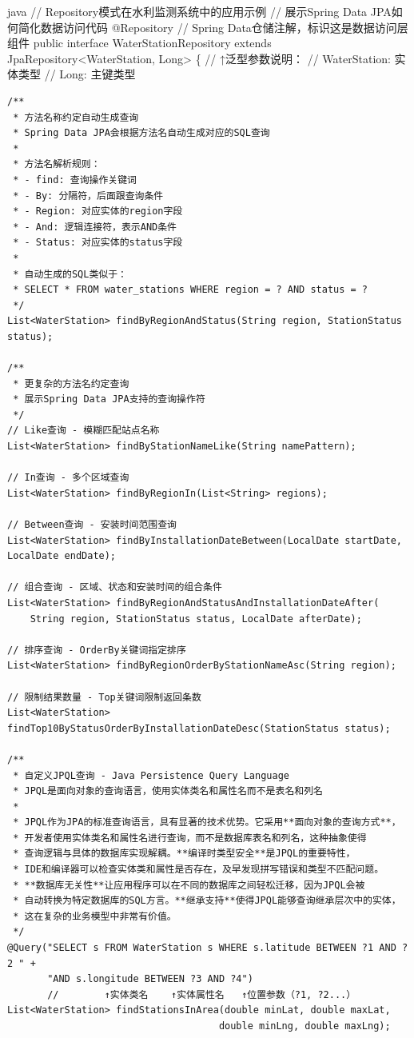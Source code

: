 java // Repository模式在水利监测系统中的应用示例 // 展示Spring Data JPA如何简化数据访问代码 @Repository // Spring Data仓储注解，标识这是数据访问层组件 public interface WaterStationRepository extends JpaRepository\textless WaterStation, Long\textgreater{} \{ // ↑泛型参数说明： // WaterStation: 实体类型 // Long: 主键类型

\begin{verbatim}
/**
 * 方法名称约定自动生成查询
 * Spring Data JPA会根据方法名自动生成对应的SQL查询
 * 
 * 方法名解析规则：
 * - find: 查询操作关键词
 * - By: 分隔符，后面跟查询条件
 * - Region: 对应实体的region字段
 * - And: 逻辑连接符，表示AND条件
 * - Status: 对应实体的status字段
 * 
 * 自动生成的SQL类似于：
 * SELECT * FROM water_stations WHERE region = ? AND status = ?
 */
List<WaterStation> findByRegionAndStatus(String region, StationStatus status);

/**
 * 更复杂的方法名约定查询
 * 展示Spring Data JPA支持的查询操作符
 */
// Like查询 - 模糊匹配站点名称
List<WaterStation> findByStationNameLike(String namePattern);

// In查询 - 多个区域查询
List<WaterStation> findByRegionIn(List<String> regions);

// Between查询 - 安装时间范围查询
List<WaterStation> findByInstallationDateBetween(LocalDate startDate, LocalDate endDate);

// 组合查询 - 区域、状态和安装时间的组合条件
List<WaterStation> findByRegionAndStatusAndInstallationDateAfter(
    String region, StationStatus status, LocalDate afterDate);

// 排序查询 - OrderBy关键词指定排序
List<WaterStation> findByRegionOrderByStationNameAsc(String region);

// 限制结果数量 - Top关键词限制返回条数
List<WaterStation> findTop10ByStatusOrderByInstallationDateDesc(StationStatus status);

/**
 * 自定义JPQL查询 - Java Persistence Query Language
 * JPQL是面向对象的查询语言，使用实体类名和属性名而不是表名和列名
 * 
 * JPQL作为JPA的标准查询语言，具有显著的技术优势。它采用**面向对象的查询方式**，
 * 开发者使用实体类名和属性名进行查询，而不是数据库表名和列名，这种抽象使得
 * 查询逻辑与具体的数据库实现解耦。**编译时类型安全**是JPQL的重要特性，
 * IDE和编译器可以检查实体类和属性是否存在，及早发现拼写错误和类型不匹配问题。
 * **数据库无关性**让应用程序可以在不同的数据库之间轻松迁移，因为JPQL会被
 * 自动转换为特定数据库的SQL方言。**继承支持**使得JPQL能够查询继承层次中的实体，
 * 这在复杂的业务模型中非常有价值。
 */
@Query("SELECT s FROM WaterStation s WHERE s.latitude BETWEEN ?1 AND ?2 " +
       "AND s.longitude BETWEEN ?3 AND ?4")
       //        ↑实体类名    ↑实体属性名   ↑位置参数（?1, ?2...）
List<WaterStation> findStationsInArea(double minLat, double maxLat, 
                                     double minLng, double maxLng);


\end{verbatim}
